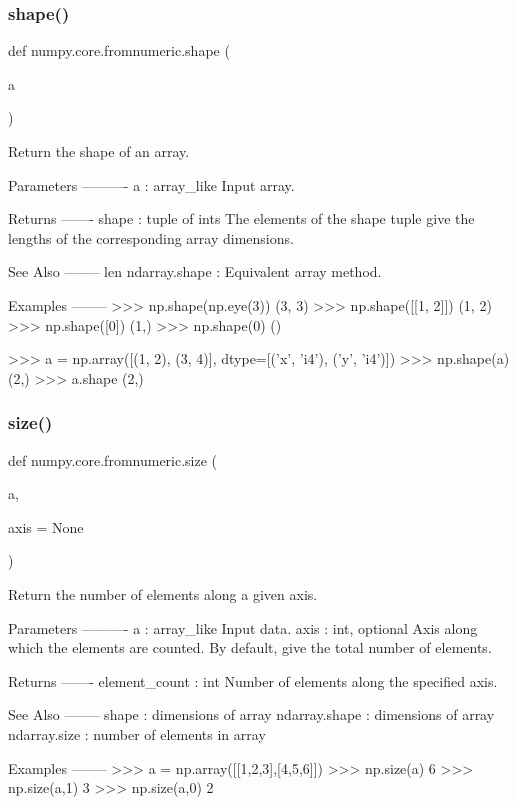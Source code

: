 \subsubsection{\texorpdfstring{shape()}{shape()}}
{\footnotesize\ttfamily def numpy.\+core.\+fromnumeric.\+shape (\begin{DoxyParamCaption}\item[{}]{a }\end{DoxyParamCaption})}

\begin{DoxyVerb}Return the shape of an array.

Parameters
----------
a : array_like
    Input array.

Returns
-------
shape : tuple of ints
    The elements of the shape tuple give the lengths of the
    corresponding array dimensions.

See Also
--------
len
ndarray.shape : Equivalent array method.

Examples
--------
>>> np.shape(np.eye(3))
(3, 3)
>>> np.shape([[1, 2]])
(1, 2)
>>> np.shape([0])
(1,)
>>> np.shape(0)
()

>>> a = np.array([(1, 2), (3, 4)], dtype=[('x', 'i4'), ('y', 'i4')])
>>> np.shape(a)
(2,)
>>> a.shape
(2,)\end{DoxyVerb}
 \mbox{\label{namespacenumpy_1_1core_1_1fromnumeric_a0fd718db4ebf1b1dd020bea493477918}} 
\subsubsection{\texorpdfstring{size()}{size()}}
{\footnotesize\ttfamily def numpy.\+core.\+fromnumeric.\+size (\begin{DoxyParamCaption}\item[{}]{a,  }\item[{}]{axis = {\ttfamily None} }\end{DoxyParamCaption})}

\begin{DoxyVerb}Return the number of elements along a given axis.

Parameters
----------
a : array_like
    Input data.
axis : int, optional
    Axis along which the elements are counted.  By default, give
    the total number of elements.

Returns
-------
element_count : int
    Number of elements along the specified axis.

See Also
--------
shape : dimensions of array
ndarray.shape : dimensions of array
ndarray.size : number of elements in array

Examples
--------
>>> a = np.array([[1,2,3],[4,5,6]])
>>> np.size(a)
6
>>> np.size(a,1)
3
>>> np.size(a,0)
2\end{DoxyVerb}
 \mbox{\label{namespacenumpy_1_1core_1_1fromnumeric_a4f3056b85b37b338f8be3268759b64a9}} 
